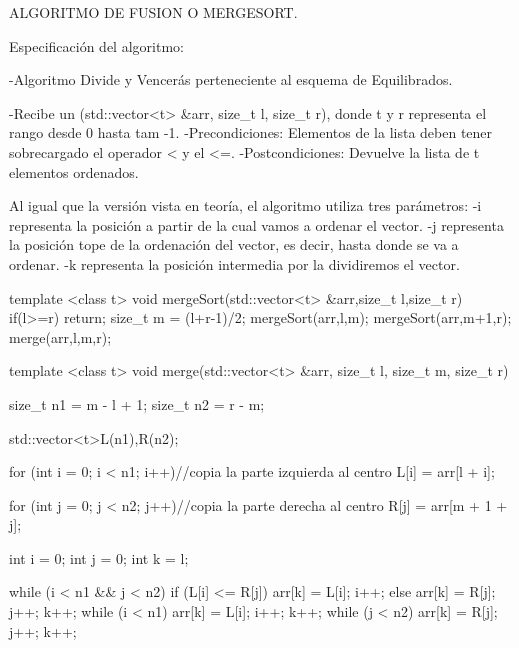 ALGORITMO DE FUSION O MERGESORT.


Especificación del algoritmo:

-Algoritmo Divide y Vencerás perteneciente al esquema de Equilibrados.

-Recibe un (std::vector<t> &arr, size_t l, size_t r), donde t y r representa el rango desde 0 hasta tam -1.  
-Precondiciones: Elementos de la lista deben tener sobrecargado el operador < y el <=.
-Postcondiciones: Devuelve la lista de t elementos ordenados.

Al igual que la versión vista en teoría, el algoritmo utiliza tres parámetros:
-i representa la posición a partir de la cual vamos a ordenar el vector.
-j representa la posición tope de la ordenación del vector, es decir, hasta donde se va a ordenar.
-k representa la posición intermedia por la dividiremos el vector.

template <class t>
void mergeSort(std::vector<t> &arr,size_t l,size_t r){
    if(l>=r){
        return;
    }
    size_t m = (l+r-1)/2;
    mergeSort(arr,l,m);
    mergeSort(arr,m+1,r);
    merge(arr,l,m,r);
}

template <class t>
void merge(std::vector<t> &arr, size_t l, size_t m, size_t r)
{
    size_t n1 = m - l + 1;
    size_t n2 = r - m;
        
    std::vector<t>L(n1),R(n2);
   
    for (int i = 0; i < n1; i++){//copia la parte izquierda al centro
        L[i] = arr[l + i];
    }
        
    for (int j = 0; j < n2; j++){//copia la parte derecha al centro
         R[j] = arr[m + 1 + j];
    }

    int i = 0;
    int j = 0;
    int k = l;
 
    while (i < n1 && j < n2) {
        if (L[i] <= R[j]) {
            arr[k] = L[i];
            i++;
        }
        else {
            arr[k] = R[j];
            j++;
        }
        k++;
    }
    while (i < n1) {
        arr[k] = L[i];
        i++;
        k++;
    } 
    while (j < n2) {
        arr[k] = R[j];
        j++;
        k++;
    }
}
